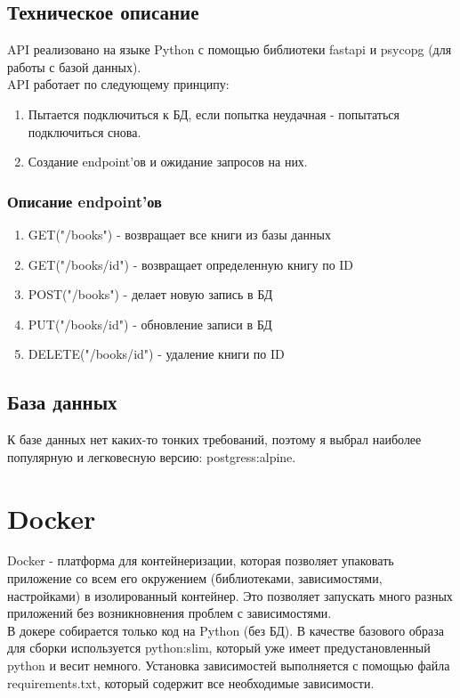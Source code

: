\subsection{Техническое описание}
API реализовано на языке Python с помощью библиотеки fastapi и psycopg (для работы с базой данных). \\

API работает по следующему принципу:
\begin{enumerate}
    \item Пытается подключиться к БД, если попытка неудачная - попытаться подключиться снова.
    \item Создание endpoint'ов и ожидание запросов на них.
\end{enumerate}

\subsubsection{Описание endpoint'ов}

\begin{enumerate}
    \item GET("/books") - возвращает все книги из базы данных
    \item GET("/books/{id}") - возвращает определенную книгу по ID
    \item POST("/books") - делает новую запись в БД
    \item PUT("/books/{id}") - обновление записи в БД
    \item DELETE("/books/{id}") - удаление книги по ID
\end{enumerate}

\subsection{База данных}
К базе данных нет каких-то тонких требований, поэтому я выбрал наиболее популярную и легковесную версию: postgress:alpine.

\section{Docker}
Docker - платформа для контейнеризации, которая позволяет упаковать приложение со всем его окружением (библиотеками, зависимостями, настройками) в 
изолированный контейнер. Это позволяет запускать много разных приложений без возникновнения проблем с зависимостями. \\

В докере собирается только код на Python (без БД). В качестве базового образа для сборки используется python:slim, который уже имеет предустановленный python и весит немного.
Установка зависимостей выполняется с помощью файла requirements.txt, который содержит все необходимые зависимости.

